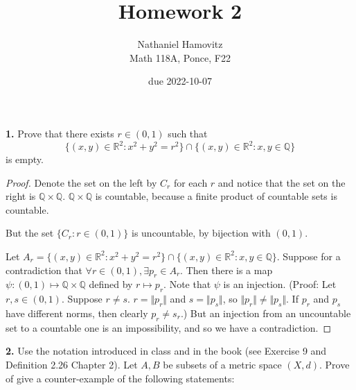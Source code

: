 \documentclass{article}
\newcommand{\R}{\mathbb{R}}
\newcommand{\N}{\mathbb{N}}
\newcommand{\Q}{\mathbb{Q}}
\begin{document}


\title{Homework 2} %
\author{Nathaniel Hamovitz\\Math 118A, Ponce, F22}
\date{due 2022-10-07}

\maketitle

\textbf{1. } %
Prove that there exists $r \in (0, 1)$ such that
$$\{(x, y) \in \R^2 : x^2 + y^2 = r^2\} \cap \{(x, y) \in \R^2 : x, y \in \Q\}$$
is empty.

\begin{proof}
    Denote the set on the left by $C_r$ for each $r$ and notice that the set on the right is $\Q \times \Q$. $\Q \times \Q$ is countable, because a finite product of countable sets is countable.
    
    
    But the set $\{C_r : r \in (0, 1)\}$ is uncountable, by bijection with $(0, 1)$.

    Let $A_r = \{(x, y) \in \R^2 : x^2 + y^2 = r^2\} \cap \{(x, y) \in \R^2 : x, y \in \Q\}$. Suppose for a contradiction that $\forall r \in (0, 1), \exists p_r \in A_r$. Then there is a map $\psi: (0, 1) \mapsto \Q \times \Q$ defined by $r \mapsto p_r$. Note that $\psi$ is an injection. (Proof: Let $r, s \in (0, 1)$. Suppose $r \ne s$. $r = \Vert p_r \Vert$ and $s = \Vert p_s \Vert$, so $\Vert p_r \Vert \ne \Vert p_s \Vert$. If $p_r$ and $p_s$ have different norms, then clearly $p_r \ne s_r$.) But an injection from an uncountable set to a countable one is an impossibility, and so we have a contradiction.   
\end{proof}

\newpage %

\textbf{2. } Use the notation introduced in class and in the book (see Exercise 9 and Definition 2.26 Chapter 2). Let $A, B$ be subsets of a metric space $(X, d)$. Prove of give a counter-example of the following statements:

\renewcommand{\labelenumi}{(\roman{enumi})}
\end{document}
